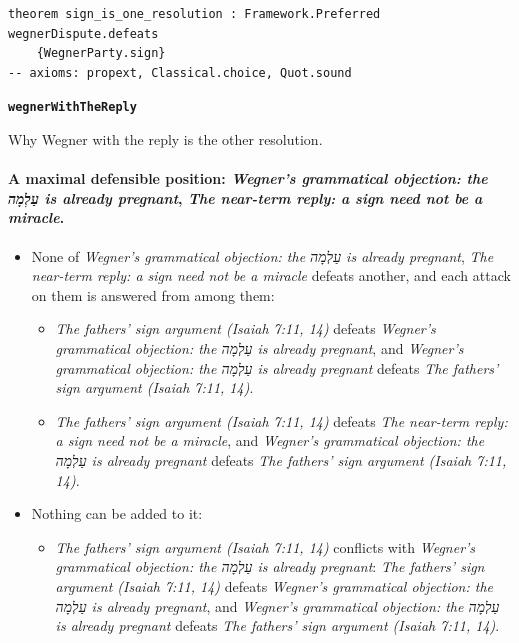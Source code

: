 \documentclass[11pt]{article}
\begin{document}
{\small\begin{verbatim}
theorem sign_is_one_resolution : Framework.Preferred wegnerDispute.defeats
    {WegnerParty.sign}
-- axioms: propext, Classical.choice, Quot.sound
\end{verbatim}}
\par\medskip\noindent\textbf{\texttt{wegner\allowbreak{}With\allowbreak{}The\allowbreak{}Reply}}\par\nobreak\noindent
Why Wegner with the reply is the other resolution.

\paragraph{A maximal defensible position: \emph{Wegner’s grammatical objection: the עַלְמָה is already pregnant}, \emph{The near-term reply: a sign need not be a miracle}.}
\begin{itemize}
\item None of \emph{Wegner’s grammatical objection: the עַלְמָה is already pregnant}, \emph{The near-term reply: a sign need not be a miracle} defeats another, and each attack on them is answered from among them:
\begin{itemize}
\item \emph{The fathers’ sign argument (Isaiah 7:11, 14)} defeats \emph{Wegner’s grammatical objection: the עַלְמָה is already pregnant}, and \emph{Wegner’s grammatical objection: the עַלְמָה is already pregnant} defeats \emph{The fathers’ sign argument (Isaiah 7:11, 14)}.
\item \emph{The fathers’ sign argument (Isaiah 7:11, 14)} defeats \emph{The near-term reply: a sign need not be a miracle}, and \emph{Wegner’s grammatical objection: the עַלְמָה is already pregnant} defeats \emph{The fathers’ sign argument (Isaiah 7:11, 14)}.
\end{itemize}
\item Nothing can be added to it:
\begin{itemize}
\item \emph{The fathers’ sign argument (Isaiah 7:11, 14)} conflicts with \emph{Wegner’s grammatical objection: the עַלְמָה is already pregnant}: \emph{The fathers’ sign argument (Isaiah 7:11, 14)} defeats \emph{Wegner’s grammatical objection: the עַלְמָה is already pregnant}, and \emph{Wegner’s grammatical objection: the עַלְמָה is already pregnant} defeats \emph{The fathers’ sign argument (Isaiah 7:11, 14)}.
\end{itemize}
\end{itemize}
\end{document}
